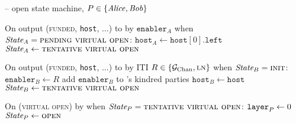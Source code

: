\begin{center}
\begin{systembox}{\fchan{} -- open state machine, $P \in \{\mathit{Alice}, \mathit{Bob}\}$}
\begin{algorithmic}[1]
      \State On output (\textsc{funded}, \texttt{host}, $\dots$) to \alice by
      $\texttt{enabler}_A$ when $\itistate_A = \textsc{pending virtual open}$:
      \Indent
        \State $\texttt{host}_A \gets \texttt{host}[0].\texttt{left}$
        \State $\itistate_A \gets \textsc{tentative virtual open}$
      \EndIndent
      \Statex

      \State On output (\textsc{funded}, \texttt{host}, $\dots$) to \bob by ITI
      $R \in \{\mathcal{G}_{\mathrm{Chan}}, \textsc{ln}\}$ when $\itistate_B = \textsc{init}$:
      \Indent
        \State $\texttt{enabler}_B \gets R$
        \State add $\texttt{enabler}_B$ to \bob's kindred parties
        \State $\texttt{host}_B \gets \texttt{host}$
        \State $\itistate_B \gets \textsc{tentative virtual open}$
      \EndIndent
      \Statex

      \State On (\textsc{virtual open}) by \adversary when $\itistate_P =
      \textsc{tentative virtual open}$:
      \Indent
        \label{code:functionality:open:virtual-balance}
        \State $\texttt{layer}_{P} \gets 0$
        \State $\itistate_P \gets \textsc{open}$
      \EndIndent
    \end{algorithmic}
  \end{systembox}
  \label{code:functionality:open}
\end{center} \ \\

